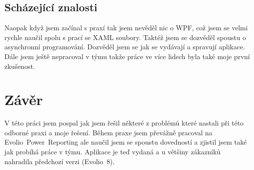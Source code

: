 \documentclass[czech,bachelor,dept460,male,csharp]{diploma}
\newcommand{\EvolioEight}{Evolio~8}
\newcommand{\EFilters}{Evolio~Power~Reporting}
\begin{document}
	\subsection{Scházející znalosti}
		Naopak když jsem začínal s praxí tak jsem nevěděl nic o WPF, což jsem se velmi rychle naučil spolu s prací se XAML soubory. Taktéž jsem se dozvěděl spoustu o asynchronní programování. Dozvěděl jsem se jak se vydávají a spravují aplikace. Dále jsem ještě nepracoval v týmu takže práce ve více lidech byla také moje první zkušenost.
		
\section{Závěr}
V této práci jsem pospal jak jsem řešil některé z problémů které nastali při této odborné praxi a moje řešení. Během praxe jsem převážně pracoval na {\EFilters} ale naučil jsem se spoustu dovedností a zjistil jsem také jak probíhá práce v týmu. Aplikace je teď vydaná a u většiny zákazníků nahradila předchozí verzi ({\EvolioEight}). 

\printbibliography[title={Literatura}, heading=bibintoc]


\end{document}
